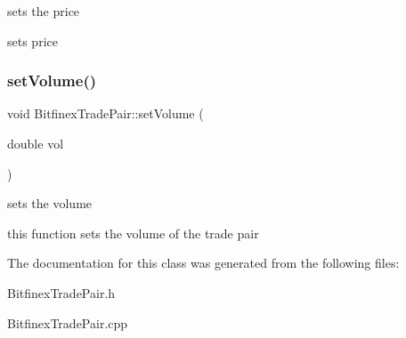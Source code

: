 sets the price 

sets price \mbox{\label{class_bitfinex_trade_pair_a0fd67bf84f3221538bbceb434a603f34}} 
\subsubsection{\texorpdfstring{set\+Volume()}{setVolume()}}
{\footnotesize\ttfamily void Bitfinex\+Trade\+Pair\+::set\+Volume (\begin{DoxyParamCaption}\item[{double}]{vol }\end{DoxyParamCaption})}



sets the volume 

this function sets the volume of the trade pair 

The documentation for this class was generated from the following files\+:\begin{DoxyCompactItemize}
\item 
Bitfinex\+Trade\+Pair.\+h\item 
Bitfinex\+Trade\+Pair.\+cpp\end{DoxyCompactItemize}
